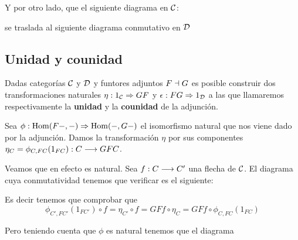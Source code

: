 Y por otro lado, que el siguiente diagrama en $\mathcal{C}$:

\begin{center}
\end{center}

se traslada al siguiente diagrama conmutativo en $\mathcal{D}$

\begin{center}
\end{center}

\subsection{Unidad y counidad}
Dadas categorías $\mathcal{C}$ y $\mathcal{D}$ y funtores adjuntos $F \dashv G$ es
posible construir dos transformaciones naturales
$\eta : 1_{\mathcal{C}}\Rightarrow GF$ y $\epsilon: FG\Rightarrow 1_{\mathcal{D}}$ a las que llamaremos
respectivamente la \textbf{unidad} y la \textbf{counidad} de la
adjunción.

Sea $\phi : \operatorname{Hom}(F-, -)\Rightarrow \operatorname{Hom}(-, G-)$ el isomorfismo natural que
nos viene dado por la adjunción. Damos la transformación $\eta$
por sus componentes
$\eta_C = \phi_{C, FC}(1_{FC}) : C\longrightarrow GFC$.

Veamos que en efecto es natural. Sea $f : C\longrightarrow C'$
una flecha de $\mathcal{C}$. El diagrama cuya conmutatividad
tenemos que verificar es el siguiente:

\begin{center}
\end{center}

Es decir tenemos que comprobar que
$$\phi_{C', FC'}(1_{FC'}) \circ f = \eta_{C'} \circ f = GFf \circ \eta_C
  = GFf \circ \phi_{C, FC}(1_{FC})$$

Pero teniendo cuenta que $\phi$ es natural tenemos que el diagrama

\begin{center}
\end{center}

